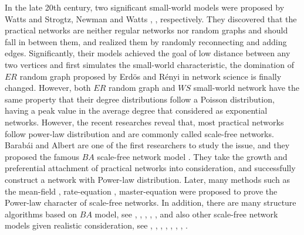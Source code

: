 \documentclass[final]{IEEEtran}
\begin{document}
In the late 20th century, two significant small-world models were
proposed by Watts and Strogtz, Newman and Watts \cite{Watts1},
\cite{Newman1}, respectively. They discovered that the practical
networks are neither regular networks nor random graphs and should
fall in between them, and realized them by randomly reconnecting
and adding edges. Significantly, their models achieved the goal of
low distance between any two vertices and first simulates the
small-world characteristic, the domination of $ER$ random graph
proposed by Erd\"{o}s and R\'{e}nyi in network science is finally
changed. However, both $ER$ random graph and $WS$ small-world
network have the same property that their degree distributions
follow a Poisson distribution, having a peak value in the average
degree that considered as exponential networks. However, the
recent researches reveal that, most practical networks follow
power-law distribution and are commonly called scale-free
networks. Barab\'{a}i and Albert are one of the first researchers
to study the issue, and they proposed the famous $BA$ scale-free
network model \cite{Barabasi}. They take the growth and
preferential attachment of practical networks into consideration,
and successfully construct a network with Power-law distribution.
Later, many methods such as the mean-field \cite{bah},
rate-equation \cite{kraa}, master-equation \cite{do} were proposed
to prove the Power-law character of scale-free networks. In
addition, there are many structure algorithms based on $BA$ model,
see \cite{doro}, \cite{jeong}, \cite{kra}, \cite{li}, \cite{cs},
and also other scale-free network models given realistic
consideration, see \cite{houu}, \cite{guang}, \cite{lian},
\cite{wen}, \cite{span}, \cite{hou}, \cite{sc}, \cite{ma}.
\end{document}
